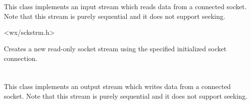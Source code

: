 
\section{}\label{wxsocketinputstream}

This class implements an input stream which reads data from
a connected socket. Note that this stream is purely sequential
and it does not support seeking.




<wx/sckstrm.h>






Creates a new read-only socket stream using the specified initialized
socket connection. 

\section{}\label{wxsocketoutputstream}

This class implements an output stream which writes data from
a connected socket. Note that this stream is purely sequential
and it does not support seeking.

